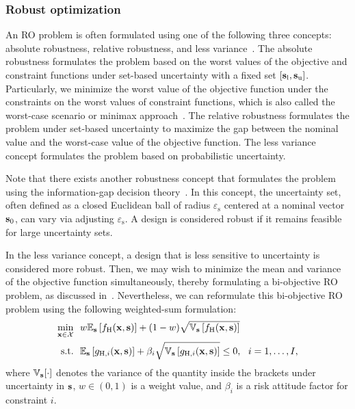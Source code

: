\documentclass[journal ]{new-aiaa}
\begin{document}
	\subsubsection{Robust optimization}\label{Sec631}
	
	An RO problem is often formulated using one of the following three concepts: absolute robustness, relative robustness, and less variance~\citep{Kanno2020}.
	The absolute robustness formulates the problem based on the worst values of the objective and constraint functions under set-based uncertainty with a fixed set $[{\bf s}_\text{l},{\bf s}_\text{u}]$.
	Particularly, we minimize the worst value of the objective function under the constraints on the worst values of constraint functions, which is also called the worst-case scenario or minimax approach~\citep[see e.g.,][]{BenTal2009,Elishakoff2010}.
	The relative robustness formulates the problem under set-based uncertainty to maximize the gap between the nominal value and the worst-case value of the objective function.
	The less variance concept formulates the problem based on probabilistic uncertainty.
	
	Note that there exists another robustness concept that formulates the problem using the information-gap decision theory~\citep{Hemez2004}.
	In this concept, the uncertainty set, often defined as a closed Euclidean ball of radius $\varepsilon_\text{s}$ centered at a nominal vector ${\bf s}_0$, can vary via adjusting $\varepsilon_\text{s}$.  
	A design is considered robust if it remains feasible for large uncertainty sets.
	
	In the less variance concept, a design that is less sensitive to uncertainty is considered more robust.
	Then, we may wish to minimize the mean and variance of the objective function simultaneously, thereby formulating a
	bi-objective RO problem, as discussed in~.
	Nevertheless, we can reformulate this bi-objective RO problem using the following weighted-sum formulation:
	\begin{equation}\label{eqn66}
		\begin{aligned}
			\underset{{\bf x} \in \mathcal{X}}{\min} \ \ & w \mathbb{E}_{\bf s}\left[f_\text{H}({\bf x},{\bf s})\right]+(1-w)\sqrt{\mathbb{V}_{\bf s}\left[f_\text{H}({\bf x},{\bf s})\right]}\\
			\textrm{s.t.} \ \ 
			&\mathbb{E}_{\bf s}\left[g_{\text{H},i}({\bf x},{\bf s})\right] 
			+ \beta_i \sqrt{\mathbb{V}_{\bf s}\left[g_{\text{H},i}({\bf x},{\bf s})\right]} \leq 0, \ \ i=1,\dots,I, 
		\end{aligned}
	\end{equation}
	where $\mathbb{V}_{\bf s}[\cdot]$ denotes the variance of the quantity inside the brackets under uncertainty in ${\bf s}$, $w \in (0,1)$ is a weight value, and $\beta_i$ is a risk attitude factor for constraint $i$.
	
\end{document}
